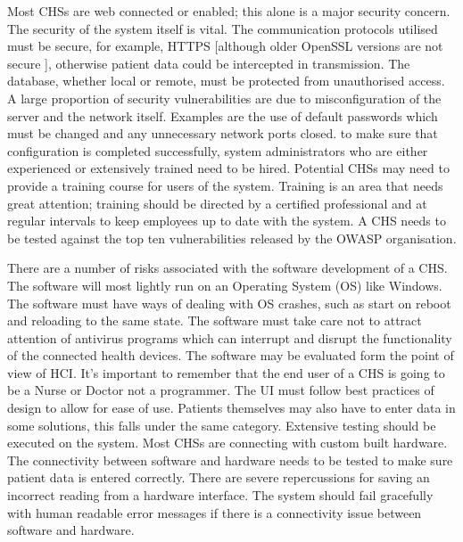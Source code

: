 Most CHSs are web connected or enabled; this alone is a major security concern. The security of the system itself is vital. The communication protocols utilised must be secure, for example, HTTPS [although older OpenSSL versions are not secure \parencite{openssl}], otherwise patient data could be intercepted in transmission. The database, whether local or remote, must be protected from unauthorised access. A large proportion of security vulnerabilities are due to misconfiguration of the server and the network itself. Examples are the use of default passwords which must be changed and any unnecessary network ports closed. to make sure that configuration is completed successfully, system administrators who are either experienced or extensively trained need to be hired. Potential CHSs may need to provide a training course for users of the system. Training is an area that needs great attention; training should be directed by a certified professional and at regular intervals to keep employees up to date with the system. A CHS needs to be tested against the top ten vulnerabilities released by the OWASP organisation.

There are a number of risks associated with the software development of a CHS. The software will most lightly run on an Operating System (OS) like Windows. The software must have ways of dealing with OS crashes, such as start on reboot and reloading to the same state. The software must take care not to attract attention of antivirus programs which can interrupt and disrupt the functionality of the connected health devices. The software may be evaluated form the point of view of HCI. It’s important to remember that the end user of a CHS is going to be a Nurse or Doctor not a programmer. The UI must follow best practices of design to allow for ease of use. Patients themselves may also have to enter data in some solutions, this falls under the same category.
Extensive testing should be executed on the system. Most CHSs are connecting with custom built hardware. The connectivity between software and hardware needs to be tested to make sure patient data is entered correctly. There are severe repercussions for saving an incorrect reading from a hardware interface. The system should fail gracefully with human readable error messages if there is a connectivity issue between software and hardware.

